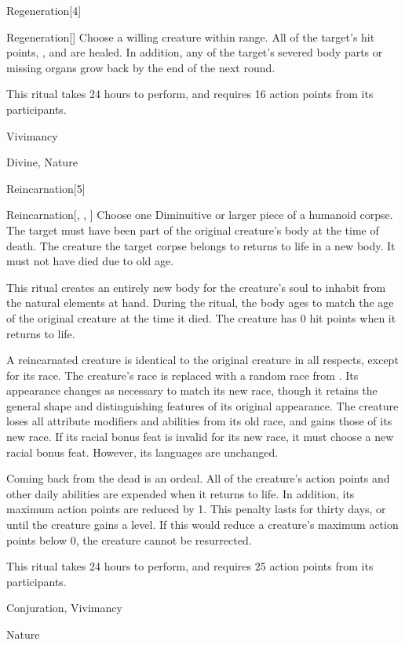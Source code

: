 \begin{spellsection}{Regeneration}[4]


\begin{ability}{Regeneration}[]
Choose a willing creature within \rngclose range.
All of the target's hit points, , and  are healed.
In addition, any of the target's severed body parts or missing organs grow back by the end of the next round.

This ritual takes 24 hours to perform, and requires 16 action points from its participants.
\end{ability}




 Vivimancy

 Divine, Nature
\end{spellsection}


\begin{spellsection}{Reincarnation}[5]


\begin{ability}{Reincarnation}[, , ]
Choose one Diminuitive or larger piece of a humanoid corpse.
The target must have been part of the original creature's body at the time of death.
The creature the target corpse belongs to returns to life in a new body.
It must not have died due to old age.

This ritual creates an entirely new body for the creature's soul to inhabit from the natural elements at hand.
During the ritual, the body ages to match the age of the original creature at the time it died.
The creature has 0 hit points when it returns to life.

A reincarnated creature is identical to the original creature in all respects, except for its race.
The creature's race is replaced with a random race from .
Its appearance changes as necessary to match its new race, though it retains the general shape and distinguishing features of its original appearance.
The creature loses all attribute modifiers and abilities from its old race, and gains those of its new race.
If its racial bonus feat is invalid for its new race, it must choose a new racial bonus feat.
However, its languages are unchanged.

Coming back from the dead is an ordeal.
All of the creature's action points and other daily abilities are expended when it returns to life.
In addition, its maximum action points are reduced by 1.
This penalty lasts for thirty days, or until the creature gains a level.
If this would reduce a creature's maximum action points below 0, the creature cannot be resurrected.

This ritual takes 24 hours to perform, and requires 25 action points from its participants.
\end{ability}




 Conjuration, Vivimancy

 Nature
\end{spellsection}


